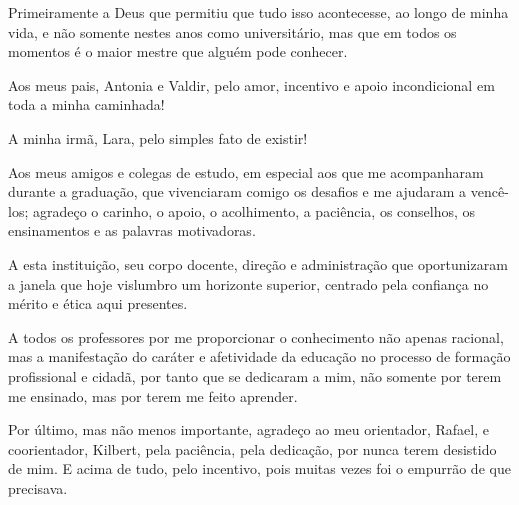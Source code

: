 Primeiramente a Deus que permitiu que tudo isso acontecesse, ao longo de minha vida, e não somente nestes anos como universitário, mas que em todos os momentos é o maior mestre que alguém pode conhecer.

Aos meus pais, Antonia e Valdir, pelo amor, incentivo e apoio incondicional em toda a minha caminhada!

A minha irmã, Lara, pelo simples fato de existir!

Aos meus amigos e colegas de estudo, em especial aos que me acompanharam durante a graduação, que vivenciaram comigo os desafios e me ajudaram a vencê-los; agradeço o carinho, o apoio, o acolhimento, a paciência, os conselhos, os ensinamentos e as palavras motivadoras.

A esta instituição, seu corpo docente, direção e administração que oportunizaram a janela que hoje vislumbro um horizonte superior, centrado pela confiança no mérito e ética aqui presentes.

A todos os professores por me proporcionar o conhecimento não apenas racional, mas a manifestação do caráter e afetividade da educação no processo de formação profissional e cidadã, por tanto que se dedicaram a mim, não somente por terem me ensinado, mas por terem me feito aprender.

Por último, mas não menos importante, agradeço ao meu orientador, Rafael, e coorientador, Kilbert, pela paciência, pela dedicação, por nunca terem desistido de mim. E acima de tudo, pelo incentivo, pois muitas vezes foi o empurrão de que precisava.